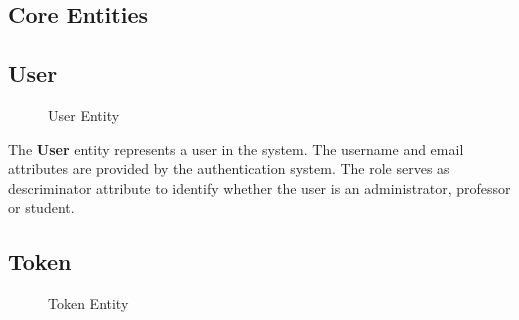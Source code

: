 \subsection*{Core Entities}
\subsection*{User}

\begin{figure}[h]
    \begin{center}
    \end{center}
    \caption{User Entity}
    \label{fig:user_entity}
\end{figure}

The \textbf{User} entity represents a user in the system. The username and email attributes are provided by the authentication system. The role serves as descriminator attribute to identify whether the user is an administrator, professor or student.

\subsection*{Token}

\begin{figure}[h]
    \begin{center}
    \end{center}
    \caption{Token Entity}
    \label{fig:token_entity}
\end{figure}

